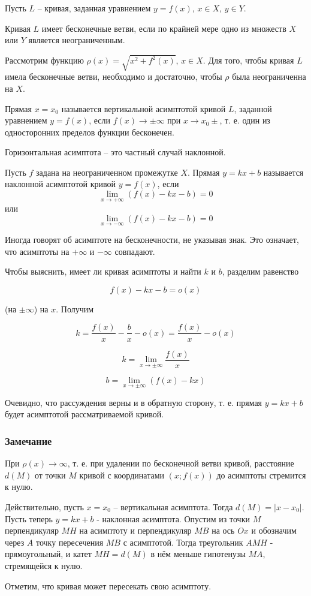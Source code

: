Пусть $L$ -- кривая, заданная уравнением $y=f(x)$, $x \in X$, $y \in Y$.

\opred

Кривая $L$ имеет бесконечные ветви, если по крайней мере одно из множеств $X$ или $Y$ является неограниченным.

Рассмотрим функцию $\rho(x)=\sqrt{x^2+f^2(x)}$, $x \in X$. Для того, чтобы кривая $L$ имела бесконечные ветви, необходимо и достаточно, чтобы $\rho$ была неограниченна на $X$.

\opred

Прямая $x=x_0$ называется вертикальной асимптотой кривой $L$, заданной уравнением $y=f(x)$, если $f(x) \to \pm \infty$ при $x \to x_0 \pm$, т. е. один из односторонних пределов функции бесконечен.

Горизонтальная асимптота -- это частный случай наклонной.

\opred

Пусть $f$ задана на неограниченном промежутке $X$. Прямая $y=kx+b$ называется наклонной асимптотой кривой $y=f(x)$, если
\[
\lim_{x\to + \infty}(f(x)-kx-b)=0
\]
или
\[
\lim_{x\to - \infty}(f(x)-kx-b)=0
\]

Иногда говорят об асимптоте на бесконечности, не указывая знак. Это означает, что асимптоты на $+\infty$ и $-\infty$ совпадают.

Чтобы выяснить, имеет ли кривая асимптоты и найти $k$ и $b$, разделим равенство

$$
f(x)-kx-b=o(x)
$$

(на $\pm \infty$) на $x$. Получим

$$
k=\frac{f(x)}{x}-\frac{b}{x}-o(x)=\frac{f(x)}{x}-o(x)
$$

\[
k=\lim_{x \to \pm \infty}\frac{f(x)}{x}
\]

\[
b=\lim_{x \to \pm \infty}(f(x)-kx)
\]

Очевидно, что рассуждения верны и в обратную сторону, т. е. прямая $y=kx+b$ будет асимптотой рассматриваемой кривой.

\subsubsection{Замечание}

При $\rho(x) \to \infty$, т. е. при удалении по бесконечной ветви кривой, расстояние $d(M)$ от точки $M$ кривой с координатами $(x; f(x))$ до асимптоты стремится к нулю.

Действительно, пусть $x=x_0$ -- вертикальная асимптота. Тогда $d(M)=|x-x_0|$.
Пусть теперь $y=kx+b$ - наклонная асимптота. Опустим из точки $M$ перпендикуляр $MH$ на асимптоту и перпендикуляр $MB$ на ось $Ox$ и обозначим через $A$ точку пересечения $MB$ с асимптотой. Тогда треугольник $AMH$ - прямоугольный, и катет $MH=d(M)$ в нём меньше гипотенузы $MA$, стремящейся к нулю.

Отметим, что кривая может пересекать свою асимптоту.
